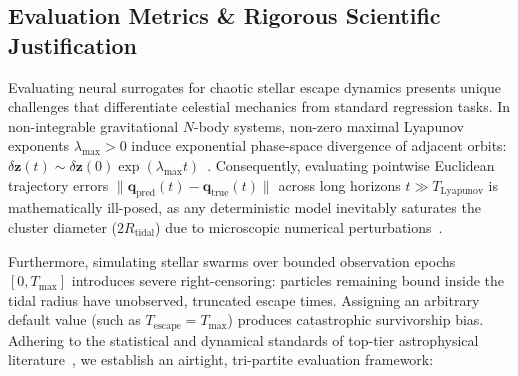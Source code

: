 \documentclass[preprint,12pt,3p]{elsarticle}
\begin{document}
\subsection{Evaluation Metrics \& Rigorous Scientific Justification}\label{sec:eval_metrics}
Evaluating neural surrogates for chaotic stellar escape dynamics presents unique challenges that differentiate celestial mechanics from standard regression tasks. In non-integrable gravitational $N$-body systems, non-zero maximal Lyapunov exponents $\lambda_{\max} > 0$ induce exponential phase-space divergence of adjacent orbits: $\delta \bm{z}(t) \sim \delta \bm{z}(0) \exp(\lambda_{\max} t)$~\cite{morbidelli2002modern,valtonen2006threebody}. Consequently, evaluating pointwise Euclidean trajectory errors $\|\bm{q}_{\mathrm{pred}}(t) - \bm{q}_{\mathrm{true}}(t)\|$ across long horizons $t \gg T_{\mathrm{Lyapunov}}$ is mathematically ill-posed, as any deterministic model inevitably saturates the cluster diameter ($2 R_{\mathrm{tidal}}$) due to microscopic numerical perturbations~\cite{breen2020newton}. 

Furthermore, simulating stellar swarms over bounded observation epochs $[0, T_{\max}]$ introduces severe right-censoring: particles remaining bound inside the tidal radius have unobserved, truncated escape times. Assigning an arbitrary default value (such as $T_{\mathrm{escape}} = T_{\max}$) produces catastrophic survivorship bias. Adhering to the statistical and dynamical standards of top-tier astrophysical literature~\cite{stone2019statistical,heggie1975binary,katznelson2024continuous}, we establish an airtight, tri-partite evaluation framework:
\end{document}
